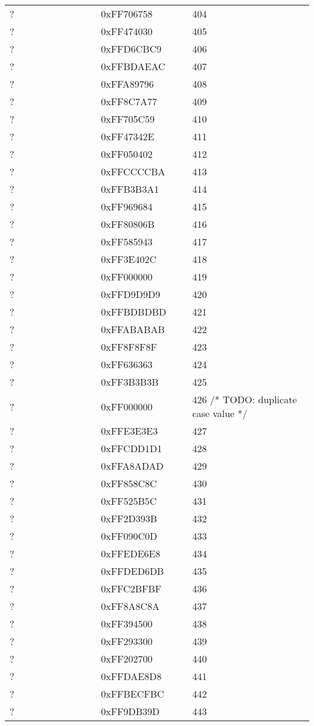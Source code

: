 \begin{longtable}{p{0.3\linewidth} p{0.3\linewidth} p{0.4\linewidth}}
? &  0xFF706758 &  404\\
? &  0xFF474030 &  405\\
? &  0xFFD6CBC9 &  406\\
? &  0xFFBDAEAC &  407\\
? &  0xFFA89796 &  408\\
? &  0xFF8C7A77 &  409\\
? &  0xFF705C59 &  410\\
? &  0xFF47342E &  411\\
? &  0xFF050402 &  412\\
? &  0xFFCCCCBA &  413\\
? &  0xFFB3B3A1 &  414\\
? &  0xFF969684 &  415\\
? &  0xFF80806B &  416\\
? &  0xFF585943 &  417\\
? &  0xFF3E402C &  418\\
? &  0xFF000000 &  419\\
? &  0xFFD9D9D9 &  420\\
? &  0xFFBDBDBD &  421\\
? &  0xFFABABAB &  422\\
? &  0xFF8F8F8F &  423\\
? &  0xFF636363 &  424\\
? &  0xFF3B3B3B &  425\\
? &  0xFF000000 &  426 /* TODO: duplicate case value */\\
? &  0xFFE3E3E3 &  427\\
? &  0xFFCDD1D1 &  428\\
? &  0xFFA8ADAD &  429\\
? &  0xFF858C8C &  430\\
? &  0xFF525B5C &  431\\
? &  0xFF2D393B &  432\\
? &  0xFF090C0D &  433\\
? &  0xFFEDE6E8 &  434\\
? &  0xFFDED6DB &  435\\
? &  0xFFC2BFBF &  436\\
? &  0xFF8A8C8A &  437\\
? &  0xFF394500 &  438\\
? &  0xFF293300 &  439\\
? &  0xFF202700 &  440\\
? &  0xFFDAE8D8 &  441\\
? &  0xFFBECFBC &  442\\
? &  0xFF9DB39D &  443\\

\end{longtable}
